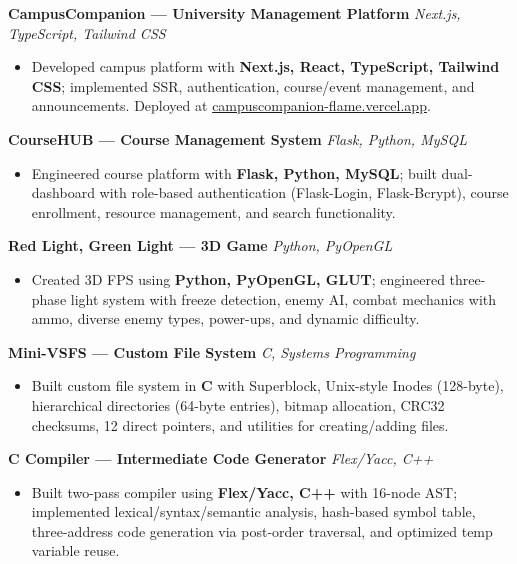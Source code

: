 \documentclass[10pt,a4paper]{article}
\newenvironment{project}{
    \begin{itemize}[leftmargin=1.0em, itemsep=1pt, topsep=1pt, parsep=1pt]
}{
    \end{itemize}
}
\begin{document}
\noindent\textbf{CampusCompanion --- University Management Platform} \hfill \textit{Next.js, TypeScript, Tailwind CSS}
\begin{project}
    \item Developed campus platform with \textbf{Next.js, React, TypeScript, Tailwind CSS}; implemented SSR, authentication, course/event management, and announcements. Deployed at \href{https://campuscompanion-flame.vercel.app}{campuscompanion-flame.vercel.app}.
\end{project}
\vspace{4pt}

\noindent\textbf{CourseHUB --- Course Management System} \hfill \textit{Flask, Python, MySQL}
\begin{project}
    \item Engineered course platform with \textbf{Flask, Python, MySQL}; built dual-dashboard with role-based authentication (Flask-Login, Flask-Bcrypt), course enrollment, resource management, and search functionality.
\end{project}
\vspace{4pt}

\noindent\textbf{Red Light, Green Light --- 3D Game} \hfill \textit{Python, PyOpenGL}
\begin{project}
    \item Created 3D FPS using \textbf{Python, PyOpenGL, GLUT}; engineered three-phase light system with freeze detection, enemy AI, combat mechanics with ammo, diverse enemy types, power-ups, and dynamic difficulty.
\end{project}
\vspace{4pt}

\noindent\textbf{Mini-VSFS --- Custom File System} \hfill \textit{C, Systems Programming}
\begin{project}
    \item Built custom file system in \textbf{C} with Superblock, Unix-style Inodes (128-byte), hierarchical directories (64-byte entries), bitmap allocation, CRC32 checksums, 12 direct pointers, and utilities for creating/adding files.
\end{project}
\vspace{4pt}

\noindent\textbf{C Compiler --- Intermediate Code Generator} \hfill \textit{Flex/Yacc, C++}
\begin{project}
    \item Built two-pass compiler using \textbf{Flex/Yacc, C++} with 16-node AST; implemented lexical/syntax/semantic analysis, hash-based symbol table, three-address code generation via post-order traversal, and optimized temp variable reuse.
\end{project}
\vspace{4pt}
\end{document}
